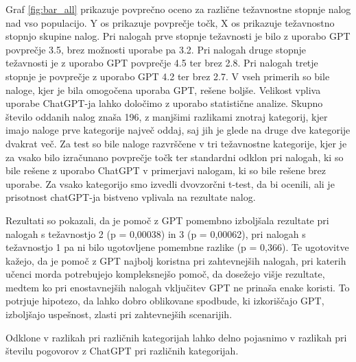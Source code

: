 \documentclass[a4paper,12pt,openright]{book}
\begin{document}
Graf \ref{fig:bar_all} prikazuje povprečno oceno za različne težavnostne stopnje nalog nad vso populacijo. Y os prikazuje povprečje točk, X os prikazuje težavnostno stopnjo skupine nalog.
Pri nalogah prve stopnje težavnosti je bilo z uporabo GPT povprečje 3.5, brez možnosti uporabe pa 3.2. Pri nalogah druge stopnje težavnosti je z uporabo GPT povprečje 4.5 ter brez 2.8. Pri nalogah tretje stopnje je povprečje z uporabo GPT 4.2 ter brez 2.7. V vseh primerih so bile naloge, kjer je bila omogočena uporaba GPT, rešene boljše.
Velikost vpliva uporabe ChatGPT-ja lahko določimo z uporabo statistične analize.
Skupno število oddanih nalog znaša 196, z manjšimi razlikami znotraj kategorij, kjer imajo naloge prve kategorije največ oddaj, saj jih je glede na druge dve kategorije dvakrat več. Za test so bile naloge razvrščene v tri težavnostne kategorije, kjer je za vsako bilo izračunano povprečje točk ter standardni odklon pri nalogah, ki so bile rešene z uporabo ChatGPT v primerjavi nalogam, ki so bile rešene brez uporabe. Za vsako kategorijo smo izvedli dvovzorčni t-test, da bi ocenili, ali je prisotnost chatGPT-ja bistveno vplivala na rezultate nalog.

Rezultati so pokazali, da je pomoč z GPT pomembno izboljšala rezultate pri nalogah s težavnostjo 2 (p = 0,00038) in 3 (p = 0,00062), pri nalogah s težavnostjo 1 pa ni bilo ugotovljene pomembne razlike (p = 0,366). Te ugotovitve kažejo, da je pomoč z GPT najbolj koristna pri zahtevnejših nalogah, pri katerih učenci morda potrebujejo kompleksnejšo pomoč, da dosežejo višje rezultate, medtem ko pri enostavnejših nalogah vključitev GPT ne prinaša enake koristi. To potrjuje hipotezo, da lahko dobro oblikovane spodbude, ki izkoriščajo GPT, izboljšajo uspešnost, zlasti pri zahtevnejših scenarijih.



Odklone v razlikah pri različnih kategorijah lahko delno pojasnimo v razlikah pri številu pogovorov z ChatGPT pri različnih kategorijah.
\end{document}
